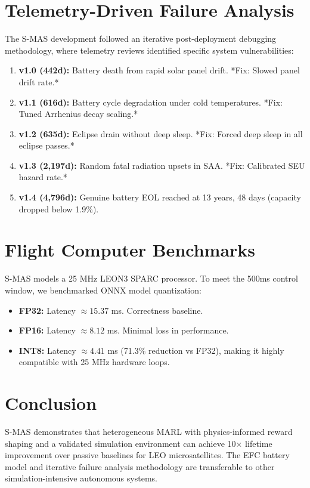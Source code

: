 \documentclass[conference]{IEEEtran}
\begin{document}
\section{Telemetry-Driven Failure Analysis}
The S-MAS development followed an iterative post-deployment debugging methodology, where telemetry reviews identified specific system vulnerabilities:
\begin{enumerate}
    \item \textbf{v1.0 (442d):} Battery death from rapid solar panel drift. *Fix: Slowed panel drift rate.*
    \item \textbf{v1.1 (616d):} Battery cycle degradation under cold temperatures. *Fix: Tuned Arrhenius decay scaling.*
    \item \textbf{v1.2 (635d):} Eclipse drain without deep sleep. *Fix: Forced deep sleep in all eclipse passes.*
    \item \textbf{v1.3 (2,197d):} Random fatal radiation upsets in SAA. *Fix: Calibrated SEU hazard rate.*
    \item \textbf{v1.4 (4,796d):} Genuine battery EOL reached at 13 years, 48 days (capacity dropped below 1.9\%).
\end{enumerate}

\section{Flight Computer Benchmarks}
S-MAS models a 25 MHz LEON3 SPARC processor. To meet the 500ms control window, we benchmarked ONNX model quantization:
\begin{itemize}
    \item \textbf{FP32:} Latency $\approx 15.37$ ms. Correctness baseline.
    \item \textbf{FP16:} Latency $\approx 8.12$ ms. Minimal loss in performance.
    \item \textbf{INT8:} Latency $\approx 4.41$ ms (71.3\% reduction vs FP32), making it highly compatible with 25 MHz hardware loops.
\end{itemize}

\section{Conclusion}
S-MAS demonstrates that heterogeneous MARL with physics-informed reward shaping and a validated simulation environment can achieve 10$\times$ lifetime improvement over passive baselines for LEO microsatellites. The EFC battery model and iterative failure analysis methodology are transferable to other simulation-intensive autonomous systems.



\end{document}
